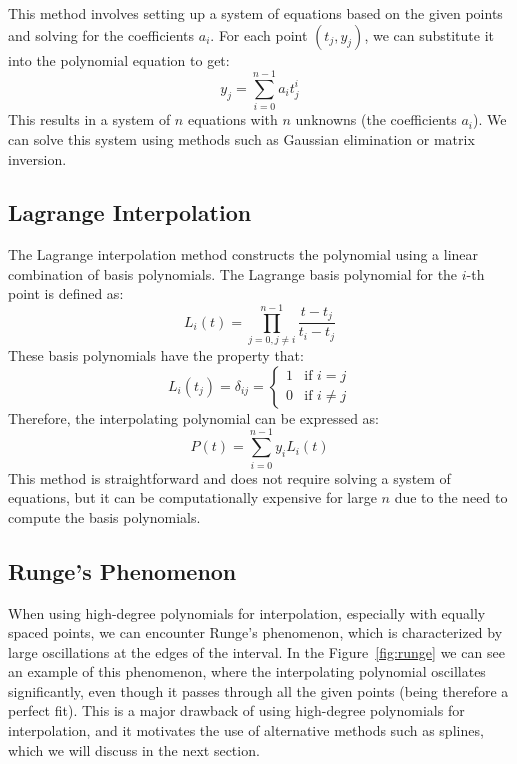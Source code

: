 This method involves setting up a system of equations based on the given points and solving for the coefficients $a_i$. For each point $(t_j, y_j)$, we can substitute it into the polynomial equation to get:
\[y_j = \sum_{i=0}^{n-1} a_i t_j^i\]
This results in a system of $n$ equations with $n$ unknowns (the coefficients $a_i$). We can solve this system using methods such as Gaussian elimination or matrix inversion.

\subsection{Lagrange Interpolation}

The Lagrange interpolation method constructs the polynomial using a linear combination of basis polynomials. The Lagrange basis polynomial for the $i$-th point is defined as:
\[L_i(t) = \prod_{j=0, j \neq i}^{n-1} \frac{t - t_j}{t_i - t_j}\]
These basis polynomials have the property that:
\[L_i(t_j) = \delta_{ij} = \begin{cases}1 & \text{if } i = j \\ 0 & \text{if } i \neq j\end{cases}\]
Therefore, the interpolating polynomial can be expressed as:
\[P(t) = \sum_{i=0}^{n-1} y_i L_i(t)\]
This method is straightforward and does not require solving a system of equations, but it can be computationally expensive for large $n$ due to the need to compute the basis polynomials.

\subsection{Runge's Phenomenon}

When using high-degree polynomials for interpolation, especially with equally spaced points, we can encounter Runge's phenomenon, which is characterized by large oscillations at the edges of the interval. In the Figure~\ref{fig:runge} we can see an example of this phenomenon, where the interpolating polynomial oscillates significantly, even though it passes through all the given points (being therefore a perfect fit). This is a major drawback of using high-degree polynomials for interpolation, and it motivates the use of alternative methods such as splines, which we will discuss in the next section.


